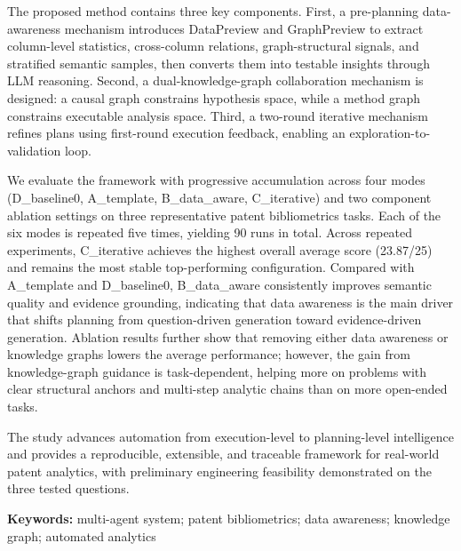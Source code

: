 The proposed method contains three key components. First, a pre-planning data-awareness mechanism introduces DataPreview and GraphPreview to extract column-level statistics, cross-column relations, graph-structural signals, and stratified semantic samples, then converts them into testable insights through LLM reasoning. Second, a dual-knowledge-graph collaboration mechanism is designed: a causal graph constrains hypothesis space, while a method graph constrains executable analysis space. Third, a two-round iterative mechanism refines plans using first-round execution feedback, enabling an exploration-to-validation loop.

We evaluate the framework with progressive accumulation across four modes (D\_baseline0, A\_template, B\_data\_aware, C\_iterative) and two component ablation settings on three representative patent bibliometrics tasks. Each of the six modes is repeated five times, yielding 90 runs in total. Across repeated experiments, C\_iterative achieves the highest overall average score (23.87/25) and remains the most stable top-performing configuration. Compared with A\_template and D\_baseline0, B\_data\_aware consistently improves semantic quality and evidence grounding, indicating that data awareness is the main driver that shifts planning from question-driven generation toward evidence-driven generation. Ablation results further show that removing either data awareness or knowledge graphs lowers the average performance; however, the gain from knowledge-graph guidance is task-dependent, helping more on problems with clear structural anchors and multi-step analytic chains than on more open-ended tasks.

The study advances automation from execution-level to planning-level intelligence and provides a reproducible, extensible, and traceable framework for real-world patent analytics, with preliminary engineering feasibility demonstrated on the three tested questions.

\vspace{1em}
\noindent\textbf{Keywords: }multi-agent system; patent bibliometrics; data awareness; knowledge graph; automated analytics
